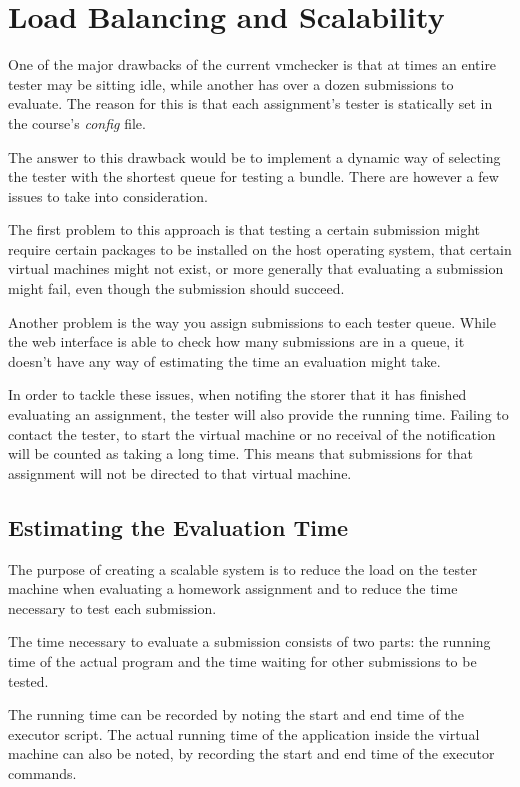\chapter{Load Balancing and Scalability}
\label{chapter:virt-load}

One of the major drawbacks of the current vmchecker is that at times an entire
tester may be sitting idle, while another has over a dozen submissions to
evaluate. The reason for this is that each assignment's tester is statically
set in the course's \textit{config} file. 

The answer to this drawback would be to implement a dynamic way of selecting
the tester with the shortest queue for testing a bundle. There are however a 
few issues to take into consideration.

The first problem to this approach is that testing a certain submission might
require certain packages to be installed on the host operating system, 
that certain virtual machines might not exist, or more generally that
evaluating a submission might fail, even though the submission should
succeed.

Another problem is the way you assign submissions to each tester queue. 
While the web interface is able to check how many submissions are in a queue,
it doesn't have any way of estimating the time an evaluation might take.

In order to tackle these issues, when notifing the storer that it has finished
evaluating an assignment, the tester will also provide the running time. 
Failing to contact the tester, to start the virtual machine or no receival of
the notification will be counted as taking a long time. This means that submissions
for that assignment will not be directed to that virtual machine.


\section{Estimating the Evaluation Time}
\label{sec:vmc-estimating}

The purpose of creating a scalable system is to reduce the load on the 
tester machine when evaluating a homework assignment and to reduce the time necessary
to test each submission.

The time necessary to evaluate a submission consists of two parts: the running
time of the actual program and the time waiting for other submissions to be tested.

The running time can be recorded by noting the start and end time of the 
executor script. The actual running time of the application inside the virtual
machine can also be noted, by recording the start and end time of the executor commands.

